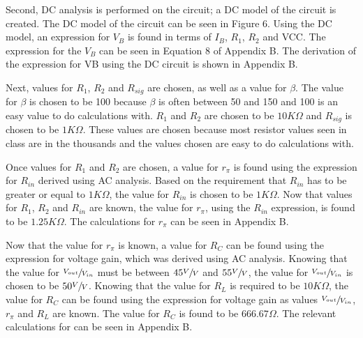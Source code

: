 \documentclass[conference]{IEEEtran}
\begin{document}
Second, DC analysis is performed on the circuit; a DC model of the circuit is created. The DC model of the circuit can be seen in Figure 6. Using the DC model, an expression for $V_B$ is found in terms of $I_B$, $R_1$, $R_2$ and VCC. The expression for the $V_B$ can be seen in Equation 8 of Appendix B. The derivation of the expression for VB using the DC circuit is shown in Appendix B.

Next, values for $R_1$, $R_2$ and $R_{sig}$ are chosen, as well as a value for $\beta$. The value for $\beta$ is chosen to be 100 because  $\beta$ is often between 50 and 150 and 100 is an easy value to do calculations with. $R_1$ and $R_2$ are chosen to be $10K\Omega$ and $R_{sig}$ is chosen to be $1K\Omega$. These values are chosen because most resistor values seen in class are in the thousands and the values chosen are easy to do calculations with.

Once values for $R_1$ and $R_2$ are chosen, a value for $r_\pi$ is found using the expression for $R_{in}$ derived using AC analysis. Based on the requirement that $R_{in}$ has to be greater or equal to $1K\Omega$, the value for $R_{in}$ is chosen to be $1K\Omega$. Now that values for $R_1$, $R_2$ and $R_{in}$ are known, the value for $r_\pi$, using the $R_{in}$ expression, is found to be $1.25K\Omega$. The calculations for $r_\pi$ can be seen in Appendix B.

Now that the value for $r_\pi$ is known, a value for $R_C$ can be found using the expression for voltage gain, which was derived using AC analysis. Knowing that the value for $\sfrac{V_{out}}{V_{in}}$ must be between $45\sfrac{V}{V}$ and $55\sfrac{V}{V}$, the value for $\sfrac{V_{out}}{V_{in}}$ is chosen to be $50\sfrac{V}{V}$. Knowing that the value for $R_L$ is required to be $10K\Omega$, the value for $R_C$ can be found using the expression for voltage gain as values $\sfrac{V_{out}}{V_{in}}$, $r_\pi$ and $R_L$ are known. The value for $R_C$ is found to be $666.67\Omega$. The relevant calculations for can be seen in Appendix B.\\
\end{document}
